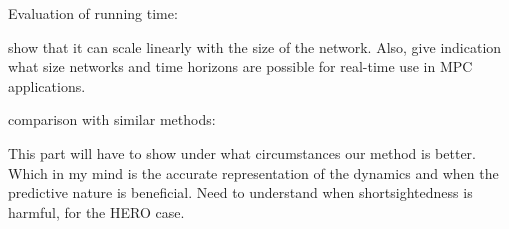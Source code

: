 
Evaluation of running time:

show that it can scale linearly with the size of the network. Also, give indication what size networks and time horizons are possible for real-time use in MPC applications.

comparison with similar methods:

This part will have to show under what circumstances our method is better. Which in my mind is the accurate representation of the dynamics and when the predictive nature is beneficial. Need to understand when shortsightedness is harmful, for the HERO case.
